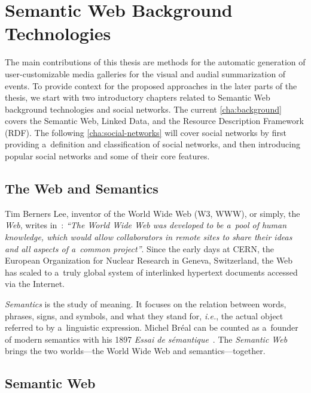\chapter{Semantic Web Background Technologies}
\label{cha:background}

\ifpdf
    \graphicspath{{2_background/figures/PNG/}{2_background/figures/PDF/}{2_background/figures/}}
\else
    \graphicspath{{2_background/figures/EPS/}{2_background/figures/}}
\fi

The main contributions of this thesis
are methods for the automatic generation of
user-customizable media galleries
for the visual and audial summarization of events.
To provide context for the proposed approaches
in the later parts of the thesis,
we start with two introductory chapters
related to Semantic Web background technologies
and social networks.
The current \autoref{cha:background} covers
the Semantic Web, Linked Data,
and the Resource Description Framework (RDF).
The following \autoref{cha:social-networks}
will cover social networks
by first providing a~definition
and classification of social networks,
and then introducing popular social networks
and some of their core features.

\section{The Web and Semantics}

Tim Berners Lee, inventor of the World Wide Web (W3, WWW),
or simply, the \emph{Web},
writes in~\cite{bernerslee1994worldwideweb}:
\textit{``The World Wide Web was developed
to be a~pool of human knowledge,
which would allow collaborators
in remote sites to share their ideas
and all aspects of a~common project''}.
Since the early days at CERN,
the European Organization for Nuclear Research
in Geneva, Switzerland,
the Web has scaled to a~truly global system
of interlinked hypertext documents
accessed via the Internet.

\emph{Semantics} is the study of meaning.
It focuses on the relation between
words, phrases, signs, and symbols,
and what they stand for, \emph{i.e.},
the actual object referred to by a~linguistic expression.
Michel Bréal can be counted as a~founder
of modern semantics with his 1897
\emph{Essai de sémantique}~\cite{breal1897essai}.
The \emph{Semantic Web} brings the two worlds---the
World Wide Web and semantics---together.

\section{Semantic Web}

